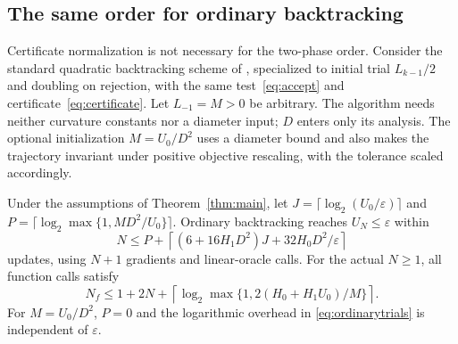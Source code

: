 \subsection{The same order for ordinary backtracking}
Certificate normalization is not necessary for the two-phase order.
Consider the standard quadratic backtracking scheme of
\cite{pedregosa}, specialized to initial trial $L_{k-1}/2$ and
doubling on rejection, with the same test~\eqref{eq:accept} and
certificate~\eqref{eq:certificate}. Let $L_{-1}=M>0$ be arbitrary.
The algorithm needs neither curvature constants nor a diameter input;
$D$ enters only its analysis. The optional initialization $M=U_0/D^2$
uses a diameter bound and also makes the trajectory invariant under
positive objective rescaling, with the tolerance scaled accordingly.

\begin{theorem}\label{thm:ordinary}
Under the assumptions of Theorem~\ref{thm:main}, let
$J=\lceil\log_2(U_0/\varepsilon)\rceil$ and
$P=\lceil\log_2\max\{1,MD^2/U_0\}\rceil$.
Ordinary backtracking reaches $U_N\le\varepsilon$ within
\begin{equation}\label{eq:ordinarycomplexity}
 N\le P+\left\lceil(6+16H_1D^2)J+32H_0D^2/\varepsilon\right\rceil
\end{equation}
updates, using $N+1$ gradients and linear-oracle calls. For the actual
$N\ge1$, all function calls satisfy
\begin{equation}\label{eq:ordinarytrials}
 N_f\le1+2N+
 \left\lceil\log_2\max\{1,2(H_0+H_1U_0)/M\}\right\rceil.
\end{equation}
For $M=U_0/D^2$, $P=0$ and the logarithmic overhead in
\eqref{eq:ordinarytrials} is independent of $\varepsilon$.
\end{theorem}

